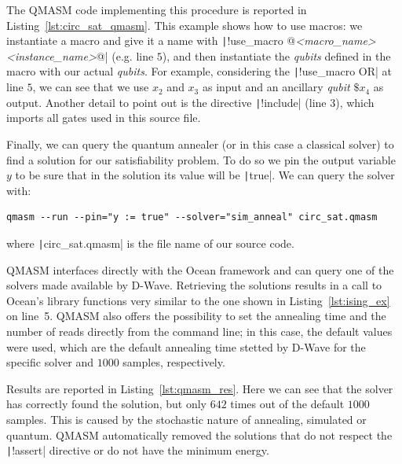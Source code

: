 The QMASM code implementing this procedure is reported in Listing~\ref{lst:circ_sat_qmasm}. This example shows how to use macros: we instantiate a macro and give it a name with \texttt|!use_macro @\textit{<macro\_name> <instance\_name>}@| (e.g. line $5$), and then instantiate the \emph{qubits} defined in the macro with our actual \emph{qubits}. For example, considering the \texttt|!use_macro OR| at line $5$, we can see that we use $x_2$ and $x_3$ as input and an ancillary \emph{qubit} $\$x_4$ as output. Another detail to point out is the directive \texttt|!include| (line $3$), which imports all gates used in this source file.

Finally, we can query the quantum annealer (or in this case a classical solver) to find a solution for our satisfiability problem. To do so we pin the output variable $y$ to be sure that in the solution its value will be \texttt|true|. We can query the solver with:

\begin{center}
	\vspace{-.1cm}
	\begin{minipage}{.95\linewidth}
		\begin{verbatim}
qmasm --run --pin="y := true" --solver="sim_anneal" circ_sat.qmasm
		\end{verbatim}
	\end{minipage}
\end{center}
where \texttt|circ_sat.qmasm| is the file name of our source code. 

QMASM interfaces directly with the Ocean framework and can query one of the solvers made available by D-Wave. Retrieving the solutions results in a call to Ocean’s library functions very similar to the one shown in Listing~\ref{lst:ising_ex} on line~5. QMASM also offers the possibility to set the annealing time and the number of reads directly from the command line; in this case, the default values were used, which are the default annealing time stetted by D-Wave for the specific solver and $1000$ samples, respectively.

Results are reported in Listing~\ref{lst:qmasm_res}. Here we can see that the solver has correctly found the solution, but only $642$ times out of the default $1000$ samples. This is caused by the stochastic nature of annealing, simulated or quantum. QMASM automatically removed the solutions that do not respect the \texttt|!assert| directive or do not have the minimum energy.

